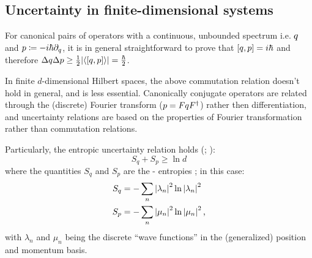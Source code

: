 \subsection{Uncertainty in finite-dimensional systems}\label{sec:finite_uncertainty}
\citereset
For canonical pairs of operators with a continuous, unbounded spectrum i.e.
${q}$ and ${p} \coloneqq -i\hbar{\partial}_{q}$,
it is in general straightforward to prove that
$\qty[{q}, {p}] = i\hbar$ and therefore
$\Delta q \Delta p \geq {\frac{1}{2} \qty|\ev{\qty[\op{q}, \op{p}]}| = \frac{\hbar}{2}}$.

In finite $d$-dimensional Hilbert spaces, the above commutation relation doesn't hold
in general, and is less essential.
Canonically conjugate operators are related
through the (discrete) Fourier transform (${p} = F{q}F^{\dagger}$)
rather then differentiation,
and uncertainty relations are based on
the properties of Fourier transformation
rather than commutation relations.

Particularly, the entropic uncertainty relation holds
(\cite[]{FiniteHilb}; \cite{Deutsch:Uncertainty}):
\begin{equation}
  S_q + S_p \geq \ln d
\end{equation}
where the quantities $S_q$ and $S_p$ are the - entropies
\parencite[.A]{Wehner:Uncertainty}; in this case:
\begin{align}
  S_q &= -\sum_n \qty|\lambda_n |^2  \ln\qty|\lambda_n|^2 \\
  S_p &= -\sum_n \qty|\mu_n     |^2  \ln\qty|\mu_n    |^2
  \,\text{,}
\end{align}
with $\lambda_n$ and $\mu_n$ being the discrete ``wave functions'' in the
(generalized) position and momentum basis.
